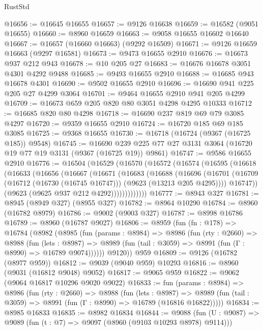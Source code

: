 \begin{lexlean}{RustStd}
\begin{coremodule}
@16656 := @16645 @16655
@16657 := @9126 @16638
@16659 := @16582 (@9051 @16655)
@16660 := @8960 @16659
@16663 := @9058 @16655 @16602 @16640
@16667 := @16657 (@16660 @16663) (@9292 @16509)
@16671 := @9126 @16659 @16663 (@9297 @16581)
@16673 := @9473 @16655 @2910
@16676 := @16673 @937 @212 @943
@16678 := @10 @205 @27
@16683 := @16676 @16678 @3051 @4301 @4292 @9488
@16685 := @9493 @16655 @2910
@16688 := @16685 @943 @16678 @4301
@16690 := @9502 @16655 @2910
@16696 := @16690 @941 @225 @205 @27 @4299 @3064
@16701 := @9464 @16655 @2910 @941 @205 @4299
@16709 := @16673 @659 @205 @820 @80 @3051 @4298 @4295 @10333
@16712 := @16685 @820 @80 @4298
@16718 := @16690 @237 @819 @69 @79 @3085 @4297
@16720 := @9359 @16655 @2910
@16724 := @16720 @185 @69 @185 @3085
@16725 := @9368 @16655
@16730 := @16718 (@16724 (@9367 (@16725 @185)) @9548)
@16745 := @16690 @239 @225 @77 @27 @3131 @3064 (@16720 @19 @77 @19 @3131 (@9367 (@16725 @19)) @9861)
@16747 := @9586 @16655 @2910
@16776 := @16504
    (@16529
      (@16570
        (@16572
          (@16574
            (@16595
              (@16618
                (@16633
                  (@16656
                    (@16667
                      (@16671
                        (@16683
                          (@16688
                            (@16696
                              (@16701
                                (@16709
                                  (@16712 (@16730 (@16745 @16747)))
                                  (@9623 (@13213 @205 @4295))))
                              @16747))
                          (@9623 (@9625 @937 @212 @4292)))))))))))))
@16777 := @8943 @327
@16781 := @8945 (@8949 @327) (@8955 @327)
@16782 := @8964 @10290
@16784 := @8960 (@16782 @8979)
@16786 := @9002 (@9003 @327)
@16787 := @8998 @16786
@16789 := @8960 (@16787 @9027)
@16806 := @8959
    (fun (fn : @178) =>
    @16784
      (@8982
        (@8985
          (fun (params : @8984) =>
          @8986
            (fun (rty : @2660) =>
            @8988
              (fun (lets : @8987) =>
              @8989 (fun (tail : @3059) => @8991 (fun (Γ : @8990) => @16789 @9074))))))
        @9120))
    @959
@16809 := @9126 (@16782 (@8977 @959))
@16812 := @9039 (@9040 @959) @10293
@16816 := @8960 (@9031 (@16812 @9048) @9052)
@16817 := @9065 @959
@16822 := @9062 (@9064 @16817 @10296 @9020 @9022)
@16833 := fun (params : @8984) =>
  @8986
    (fun (rty : @2660) =>
    @8988
      (fun (lets : @8987) =>
      @8989 (fun (tail : @3059) => @8991 (fun (Γ : @8990) => @16789 (@16816 @16822)))))
@16834 := @8985 @16833
@16835 := @8982 @16834
@16844 := @9088
    (fun (U : @9087) => @9089 (fun (t : @7) => @9097 (@8960 (@9103 @10293 @8978) @9114)))

\end{coremodule}
\end{lexlean}

